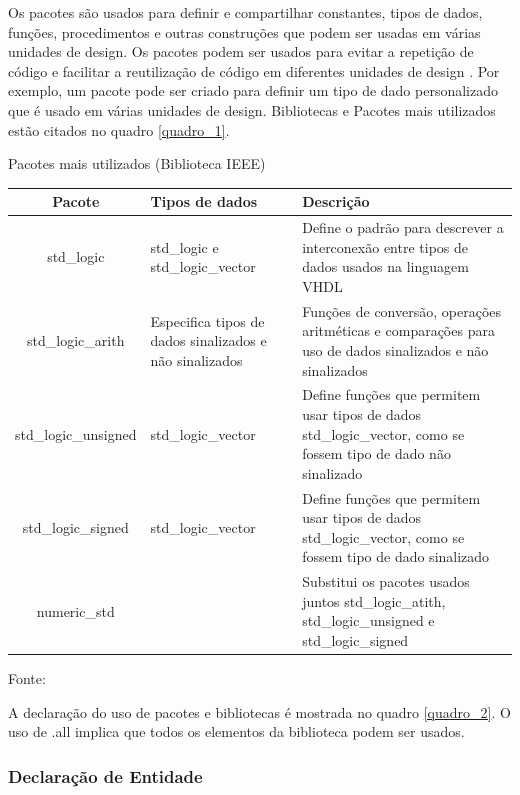 Os pacotes são usados para definir e compartilhar constantes, tipos de dados, funções, procedimentos e outras construções que podem ser usadas em várias unidades de design. Os pacotes podem ser usados para evitar a repetição de código e facilitar a reutilização de código em diferentes unidades de design \cite{ordonez2003projeto}. Por exemplo, um pacote pode ser criado para definir um tipo de dado personalizado que é usado em várias unidades de design. 
Bibliotecas e Pacotes mais utilizados estão citados no quadro \ref{quadro_1}.

\begin{quadro}[h]
    \caption{Pacotes mais utilizados (Biblioteca IEEE)}
    \label{quadro_1}
    \centering
     \begin{tabular}{|c|p{3cm}|p{8cm}|}
      \hline
      \textbf{Pacote} & \textbf{Tipos de dados} & \textbf{Descrição} \\
      \hline
      std\_logic & std\_logic e std\_logic\_vector & Define o padrão para descrever a interconexão entre tipos de dados usados na linguagem VHDL \\
      \hline
       std\_logic\_arith & Especifica tipos de dados sinalizados e não sinalizados & Funções de conversão, operações aritméticas e comparações para uso de dados sinalizados e não sinalizados \\
      \hline
       std\_logic\_unsigned & std\_logic\_vector & Define funções que permitem usar tipos de dados std\_logic\_vector, como se fossem tipo de dado não sinalizado \\
      \hline
       std\_logic\_signed & std\_logic\_vector & Define funções que permitem usar tipos de dados std\_logic\_vector, como se fossem tipo de dado sinalizado \\
      \hline
       numeric\_std & & Substitui os pacotes usados juntos std\_logic\_atith, std\_logic\_unsigned e std\_logic\_signed \\
      \hline                 
    \end{tabular}
  \vspace{1.5pt}
  \caption*{\footnotesize Fonte: \cite{ordonez2003projeto}}
\end{quadro}

A declaração do uso de pacotes e bibliotecas é mostrada no quadro \ref{quadro_2}. O uso de .all implica que todos os elementos da biblioteca podem ser usados.


\subsubsection{Declaração de Entidade}

